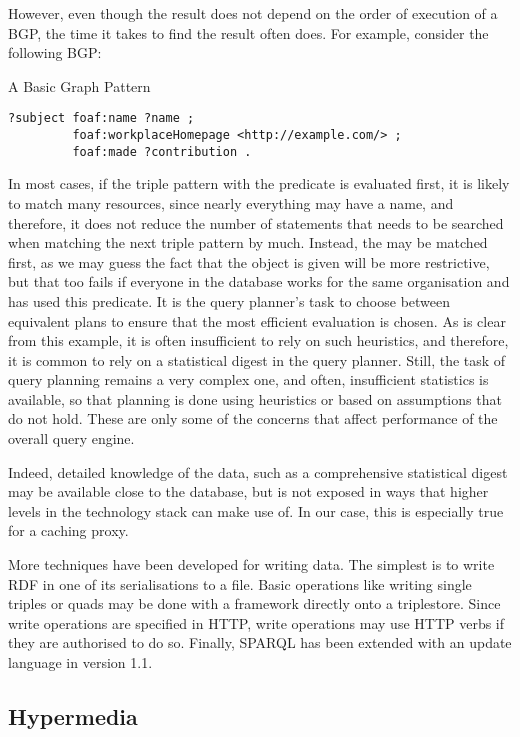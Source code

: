 However, even though the result does not depend on the order of
execution of a BGP, the time it takes to find the result often does. For
example, consider the following BGP:
\begin{example}{A Basic Graph Pattern}\label{ex:bgp}
\begin{verbatim}
?subject foaf:name ?name ;
         foaf:workplaceHomepage <http://example.com/> ;
         foaf:made ?contribution .
\end{verbatim}
\end{example}
In most cases, if the triple pattern with the 
predicate is evaluated first, it is likely to match many resources,
since nearly everything may have a name, and therefore, it does not
reduce the number of statements that needs to be searched when
matching the next triple pattern by much. Instead, the
 may be matched first, as we may guess
the fact that the object is given will be more restrictive, but that
too fails if everyone in the database works for the same organisation
and has used this predicate. It is the query planner's task to choose
between equivalent plans to ensure that the most efficient evaluation
is chosen. As is clear from this example, it is often insufficient to
rely on such heuristics, and therefore, it is common to rely on a
statistical digest in the query planner. Still, the task of query
planning remains a very complex one, and often, insufficient
statistics is available, so that planning is done using heuristics or
based on assumptions that do not hold. These are only some of the
concerns that affect performance of the overall query engine.

Indeed, detailed knowledge of the data, such as a comprehensive
statistical digest may be available close to the database, but is not
exposed in ways that higher levels in the technology stack can make
use of. In our case, this is especially true for a caching proxy.

More techniques have been developed for writing data. The simplest is
to write RDF in one of its serialisations to a file. Basic operations
like writing single triples or quads may be done with a framework
directly onto a triplestore. Since write operations are specified in
HTTP, write operations may use HTTP verbs if they are authorised to do
so. Finally, SPARQL has been extended with an update language in
version 1.1.

\subsection{Hypermedia}

